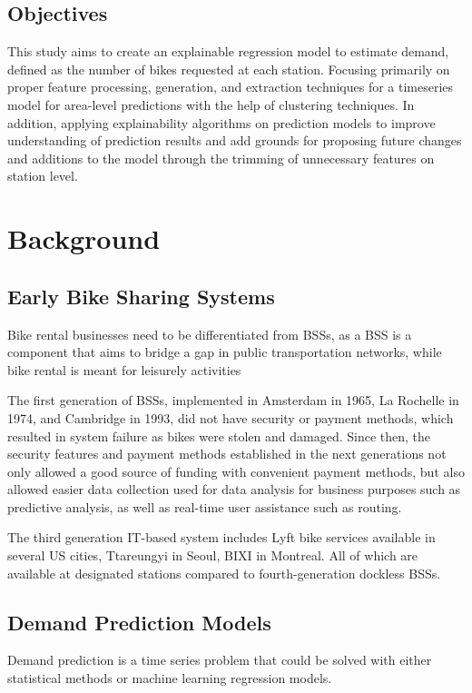 \documentclass{article}
\begin{document}
\subsection{Objectives}

This study aims to create an explainable regression model to estimate demand, defined as the number of bikes requested at each station. Focusing primarily on proper feature processing, generation, and extraction techniques for a timeseries model for area-level predictions with the help of clustering techniques. In addition, applying explainability algorithms on prediction models to improve understanding of prediction results and add grounds for proposing future changes and additions to the model through the trimming of unnecessary features on station level.


\section{Background}
\subsection{Early Bike Sharing Systems}

Bike rental businesses need to be differentiated from BSSs, as a BSS is a component that aims to bridge a gap in public transportation networks, while bike rental is meant for leisurely activities\cite{Shaheen2010}

The first generation of BSSs, implemented in Amsterdam in 1965, La Rochelle in 1974, and Cambridge in 1993, did not have security or payment methods, which resulted in system failure as bikes were stolen and damaged\cite{Shaheen2010}. Since then, the security features and payment methods established in the next generations not only allowed a good source of funding with convenient payment methods\cite{Nikiforiadis2019}\cite{LyftBikes}, but also allowed easier data collection used for data analysis for business purposes such as predictive analysis, as well as real-time user assistance such as routing\cite{Nikiforiadis2019}.

The third generation IT-based system includes Lyft bike services available in several US cities\cite{LyftBikes},  Ttareungyi in Seoul\cite{Cho2021}, BIXI in Montreal\cite{Mehdi2022}. All of which are available at designated stations compared to fourth-generation dockless BSSs\cite{Shaheen2010}\cite{Nikiforiadis2019}.  

\subsection{Demand Prediction Models}
Demand prediction is a time series problem that could be solved with either statistical methods or machine learning regression models.
\end{document}
